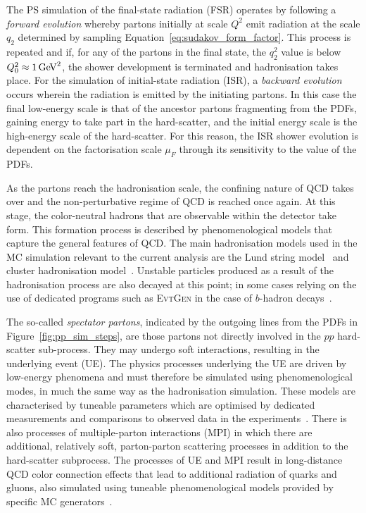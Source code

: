 The PS simulation of the final-state radiation (FSR) operates by following a \textit{forward evolution} whereby partons initially at scale $Q^2$
emit radiation at the scale $q_2$ determined by sampling Equation~\ref{eq:sudakov_form_factor}. This process is repeated and if,
for any of the partons in the final state, the $q_2^2$ value is below $Q_0^2 \approx 1\,\text{Ge\kern -0.1em V}^2$, the shower development is terminated
and hadronisation takes place.
For the simulation of initial-state radiation (ISR), a \textit{backward evolution} occurs wherein the radiation is emitted
by the initiating partons. In this case the final low-energy scale is that of the ancestor partons fragmenting from the PDFs, gaining energy to take part
in the hard-scatter, and the initial energy scale is the high-energy scale of the hard-scatter.
For this reason, the ISR shower evolution is dependent on the factorisation scale $\mu_F$ through
its sensitivity to the value of the PDFs.

As the partons reach the hadronisation scale, the confining nature of QCD takes over and the non-perturbative regime of QCD is reached
once again.
At this stage, the color-neutral hadrons that are observable within the detector take form.
This formation process is described by phenomenological models that capture the general
features of QCD.
The main hadronisation models used in the MC simulation relevant to the current analysis are the
Lund string model~\cite{Andersson:1983ia} and cluster hadronisation model~\cite{Webber:1983if}.
Unstable particles produced as a result of the hadronisation process are also decayed at this point;
in some cases relying on the use of dedicated programs such as \textsc{EvtGen} in the case of $b$-hadron decays~\cite{Lange:2001uf}.

The so-called \textit{spectator partons}, indicated by the outgoing lines from the PDFs in Figure~\ref{fig:pp_sim_steps},
are those partons not directly involved in the $pp$ hard-scatter sub-process.
They may undergo soft interactions, resulting in the underlying event (UE).
The physics processes underlying the UE are driven by low-energy phenomena and must therefore
be simulated using phenomenological modes, in much the same way as the hadronisation simulation.
These models are characterised by tuneable parameters which are optimised by dedicated measurements
and comparisons to observed data in the experiments~\cite{UESim}.
There is also processes of multiple-parton interactions (MPI) in which there are additional,
relatively soft, parton-parton scattering processes in addition to the hard-scatter subprocess.
The processes of UE and MPI result in long-distance QCD color connection effects that lead
to additional radiation of quarks and gluons, also simulated using tuneable phenomenological models
provided by specific MC generators~\cite{Sjostrand:2006za,Butterworth:1996zw}.



